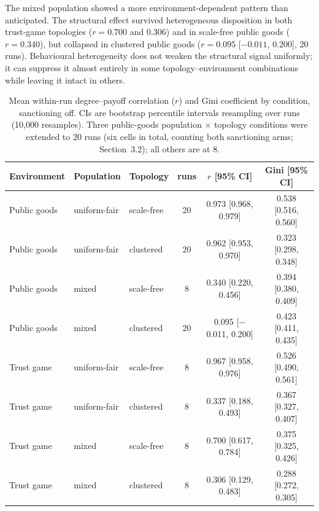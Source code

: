 \documentclass[11pt,a4paper]{article}
\begin{document}
The mixed population showed a more environment-dependent pattern than
anticipated. The structural effect survived heterogeneous disposition
in both trust-game topologies ($r=0.700$ and $0.306$) and in
scale-free public goods ($r=0.340$), but collapsed in clustered public
goods ($r=0.095$ [$-0.011$, $0.200$], 20 runs). Behavioural
heterogeneity does not weaken the structural signal uniformly; it can
suppress it almost entirely in some topology--environment combinations
while leaving it intact in others.

\begin{table}[ht]
\centering
\caption{Mean within-run degree--payoff correlation ($r$) and Gini
coefficient by condition, sanctioning off. CIs are bootstrap
percentile intervals resampling over runs (10,000 resamples). Three
public-goods population $\times$ topology conditions were extended to
20 runs (six cells in total, counting both sanctioning arms;
Section~3.2); all others are at 8.}
\label{tab:h1}
\begin{tabular}{lllccc}
\toprule
Environment & Population & Topology & runs & $r$ [95\% CI] & Gini [95\% CI] \\
\midrule
Public goods & uniform-fair & scale-free & 20 & 0.973 [0.968, 0.979] & 0.538 [0.516, 0.560] \\
Public goods & uniform-fair & clustered  & 20 & 0.962 [0.953, 0.970] & 0.323 [0.298, 0.348] \\
Public goods & mixed        & scale-free & 8  & 0.340 [0.220, 0.456] & 0.394 [0.380, 0.409] \\
Public goods & mixed        & clustered  & 20 & 0.095 [$-$0.011, 0.200] & 0.423 [0.411, 0.435] \\
Trust game    & uniform-fair & scale-free & 8  & 0.967 [0.958, 0.976] & 0.526 [0.490, 0.561] \\
Trust game    & uniform-fair & clustered  & 8  & 0.337 [0.188, 0.493] & 0.367 [0.327, 0.407] \\
Trust game    & mixed        & scale-free & 8  & 0.700 [0.617, 0.784] & 0.375 [0.325, 0.426] \\
Trust game    & mixed        & clustered  & 8  & 0.306 [0.129, 0.483] & 0.288 [0.272, 0.305] \\
\bottomrule
\end{tabular}
\end{table}
\end{document}
